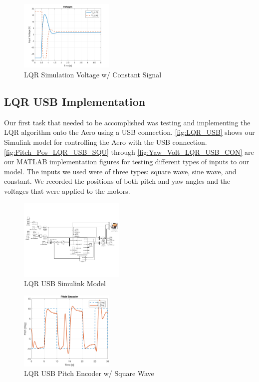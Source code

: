 \documentclass[letterpaper, 10pt, conference]{ieeeconf}
\begin{document}
\begin{figure}
  \centering
  \includegraphics[width=0.4\textwidth]{figs/matlab/LQR/P_Simulation/LQR_Volt_Con}
  \caption{LQR Simulation Voltage w/ Constant Signal}
  \label{fig:LQR_Volt_Con}
\end{figure}

\subsection{LQR USB Implementation} \label{sec:LQR_USB_imp}

Our first task that needed to be accomplished was testing and implementing the LQR algorithm onto the Aero using a USB connection.  \autoref{fig:LQR_USB} shows our Simulink model for controlling the Aero with the USB connection.  \autoref{fig:Pitch_Pos_LQR_USB_SQU} through \autoref{fig:Yaw_Volt_LQR_USB_CON} are our MATLAB implementation figures for testing different types of inputs to our model.  The inputs we used were of three types: square wave, sine wave, and constant.  We recorded the positions of both pitch and yaw angles and the voltages that were applied to the motors.

\begin{figure}
  \centering
  \includegraphics[width=0.45\textwidth]{figs/img/LQR_USB}
  \caption{LQR USB Simulink Model}
  \label{fig:LQR_USB}
\end{figure}

\begin{figure}
  \centering
  \includegraphics[width=0.4\textwidth]{figs/matlab/LQR/P_USB/Pitch_Pos_LQR_USB_SQU}
  \caption{LQR USB Pitch Encoder w/ Square Wave}
  \label{fig:Pitch_Pos_LQR_USB_SQU}
\end{figure}
\end{document}
